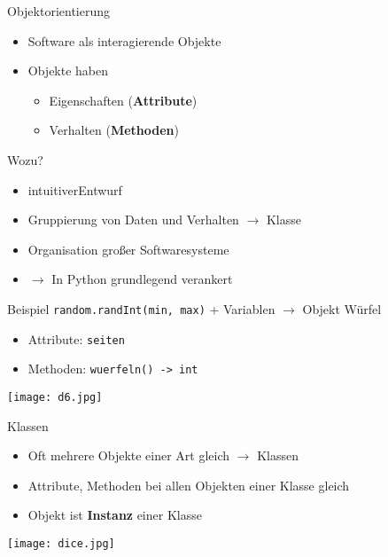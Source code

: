 \begin{frame}{\glqq Objektorientierung\grqq}
    \begin{itemize}
        \item Software als interagierende \glqq Objekte\grqq
        \item Objekte haben 
        \begin{itemize}
            \item Eigenschaften (\textbf{Attribute})
            \item Verhalten (\textbf{Methoden})
        \end{itemize}
    \end{itemize}
\end{frame}
\begin{frame}{Wozu?}
    \begin{itemize}
        \item \glqq intuitiver\grqq Entwurf
        \item Gruppierung von Daten und Verhalten $\rightarrow$ Klasse 
        \item Organisation großer Softwaresysteme
        \item $\rightarrow$ In Python grundlegend verankert
    \end{itemize}
\end{frame}
\begin{frame}{Beispiel}
    \texttt{random.randInt(min, max)} + Variablen $\rightarrow$ Objekt \glqq Würfel\grqq \begin{itemize}
        \item Attribute: \texttt{seiten}
        \item Methoden: \texttt{wuerfeln() -> int}
    \end{itemize}
    \begin{center}
        \texttt{[image: d6.jpg]}
    \end{center}
\end{frame}
\begin{frame}{Klassen}
    \begin{itemize}
        \item Oft mehrere Objekte einer Art gleich $\rightarrow$ Klassen
        \item Attribute, Methoden bei allen Objekten einer Klasse gleich
        \item Objekt ist \textbf{Instanz} einer Klasse
    \end{itemize}
    \texttt{[image: dice.jpg]}
\end{frame}

